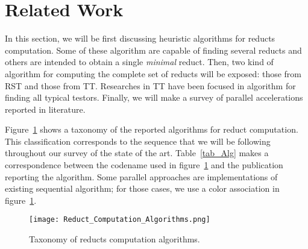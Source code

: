\documentclass[11pt]{article}   %
\begin{document}
\section{Related Work}\label{relatedWork}
  In this section, we will be first discussing heuristic algorithms for reducts computation. Some of these 
  algorithm are capable of finding several reducts and others are intended to obtain a single \textit{minimal} 
  reduct. Then, two kind of algorithm for computing the complete set of reducts will be exposed: those 
  from RST and those from TT. Researches in TT have been focused in algorithm for finding all typical testors.
  Finally, we will make a survey of parallel accelerations reported in literature.  
  
  Figure~\ref{fig_Tax} shows a taxonomy of the reported algorithms for reduct computation. This classification
  corresponds to the sequence that we will be following throughout our survey of the state of the art. 
  Table~\ref{tab_Alg} makes a correspondence between the codename used in figure~\ref{fig_Tax} and the 
  publication reporting the algorithm. Some parallel approaches are implementations of existing sequential 
  algorithm; for those cases, we use a color association in figure~\ref{fig_Tax}.

  \begin{figure}[htb] 
    \centering
    \texttt{[image: Reduct\_Computation\_Algorithms.png]}
	\caption{Taxonomy of reducts computation algorithms.}
	\label{fig_Tax}
 \end{figure}
 
\end{document}
